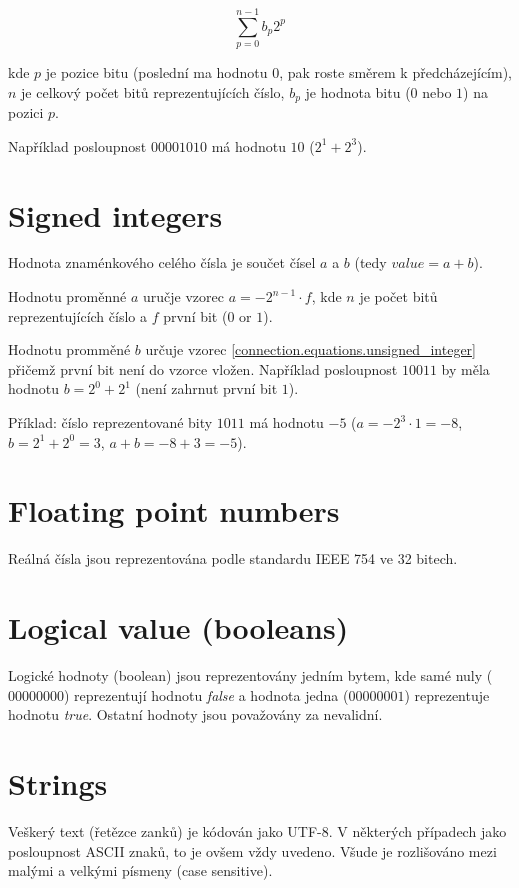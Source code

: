 \begin{equation}
\label{connection.equations.unsigned_integer}
\sum_{p = 0}^{n - 1} b_p 2^p
\end{equation}

kde $p$ je pozice bitu (poslední ma hodnotu $0$, pak roste směrem k předcházejícím), $n$ je celkový počet bitů reprezentujících číslo, $b_p$ je hodnota bitu ($0$ nebo $1$) na pozici $p$.

Například posloupnost $00001010$ má hodnotu $10$ ($2^1 + 2^3$).

\section{Signed integers}

Hodnota znaménkového celého čísla je součet čísel $a$ a $b$ (tedy ${value} = a + b$). 

Hodnotu proměnné $a$ uručje vzorec $a = -2^{n - 1} \cdot f$, kde $n$ je počet bitů reprezentujících číslo a $f$ první bit ($0$ or $1$).

Hodnotu promměné $b$ určuje vzorec \ref{connection.equations.unsigned_integer} přičemž první bit není do vzorce vložen. Například posloupnost $10011$ by měla hodnotu $b = 2^0 + 2^1$ (není zahrnut první bit $1$).

Příklad: číslo reprezentované bity $1011$ má hodnotu $-5$ ($a = -2^3 \cdot 1 = -8$, $b = 2^1 + 2^0 = 3$, $a + b = -8 + 3 = -5$).

\section{Floating point numbers}

Reálná čísla jsou reprezentována podle standardu IEEE 754 ve 32 bitech.

\section{Logical value (booleans)} 

Logické hodnoty (boolean) jsou reprezentovány jedním bytem, kde samé nuly ($00000000$) reprezentují hodnotu \emph{false} a hodnota jedna ($00000001$) reprezentuje hodnotu \emph{true}. Ostatní hodnoty jsou považovány za nevalidní.

\section{Strings}

Veškerý text (řetězce zanků) je kódován jako UTF-8. V některých případech jako posloupnost ASCII znaků, to je ovšem vždy uvedeno. Všude je rozlišováno mezi malými a velkými písmeny (case sensitive).

